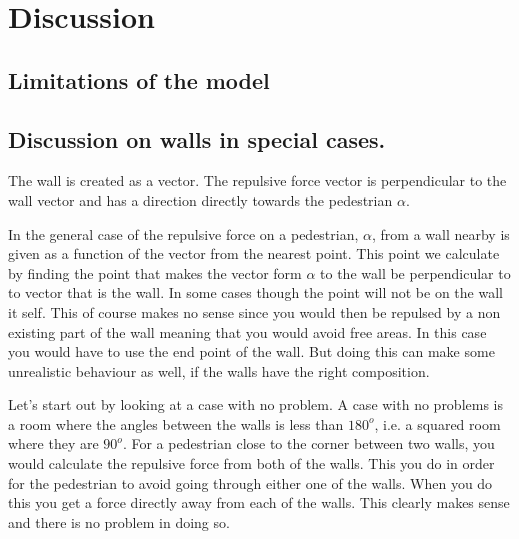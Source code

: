 \section{Discussion}\label{sec:discussion}
\subsection{Limitations of the model}

\subsection{Discussion on walls in special cases.}\label{wallEndpoints}
The wall is created as a vector. The repulsive force vector is perpendicular to the wall 
vector and has a direction directly towards the pedestrian $\alpha$.

In the general case of the repulsive force on a pedestrian, $\alpha$, from a wall 
nearby is given as a function of the vector from the nearest point. This point we 
calculate by finding the point that makes the vector form $\alpha$ to the wall be 
perpendicular to to vector that is the wall. In some cases though the point will not 
be on the wall it self. This of course makes no sense since you would then be 
repulsed by a non existing part of the wall meaning that you would avoid free 
areas. In this case you would have to use the end point of the wall. But doing this 
can make some unrealistic behaviour as well, if the walls have the right composition. 

Let's start out by looking at a case with no problem. A case with no problems is a 
room where the angles between the walls is less than $180^o$, i.e. a squared room 
where they are $90^o$. For a pedestrian close to the corner between two walls, you 
would calculate the repulsive force from both of the walls. This you do in order 
for the pedestrian to avoid going through either one of the walls. When you do 
this you get a force directly away from each of the walls. This clearly makes 
sense and there is no problem in doing so.

